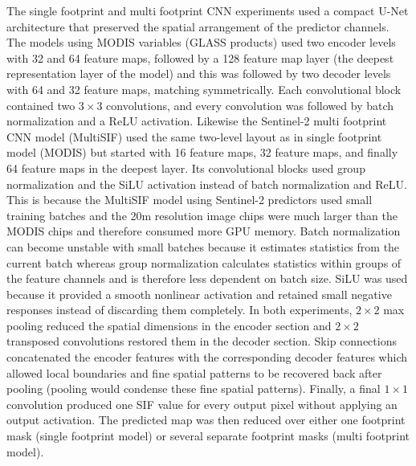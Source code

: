 The single footprint and multi footprint CNN experiments used a compact U-Net architecture that preserved the spatial arrangement of the predictor channels. The models using MODIS variables (GLASS products) used two encoder levels with 32 and 64 feature maps, followed by a 128 feature map layer (the deepest representation layer of the model) and this was followed by two decoder levels with 64 and 32 feature maps, matching symmetrically. Each convolutional block contained two $3\times3$ convolutions, and every convolution was followed by batch normalization and a ReLU activation. Likewise the Sentinel-2 multi footprint CNN model (MultiSIF) used the same two-level layout as in single footprint model (MODIS) but started with 16 feature maps, 32 feature maps, and finally 64 feature maps in the deepest layer. Its convolutional blocks used group normalization and the SiLU activation instead of batch normalization and ReLU. This is because the MultiSIF model using Sentinel-2 predictors used small training batches and the 20m resolution image chips were much larger than the MODIS chips and therefore consumed more GPU memory. Batch normalization can become unstable with small batches because it estimates statistics from the current batch whereas group normalization calculates statistics within groups of the feature channels and is therefore less dependent on batch size. SiLU was used because it provided a smooth nonlinear activation and retained small negative responses instead of discarding them completely. In both experiments, $2\times2$ max pooling reduced the spatial dimensions in the encoder section and  $2\times2$ transposed convolutions restored them in the decoder section. Skip connections concatenated the encoder features with the corresponding decoder features which allowed local boundaries and fine spatial patterns to be recovered back after pooling (pooling would condense these fine spatial patterns). Finally, a final $1\times1$ convolution produced one SIF value for every output pixel without applying an output activation. The predicted map was then reduced over either one footprint mask (single footprint model) or several separate footprint masks (multi footprint model).
